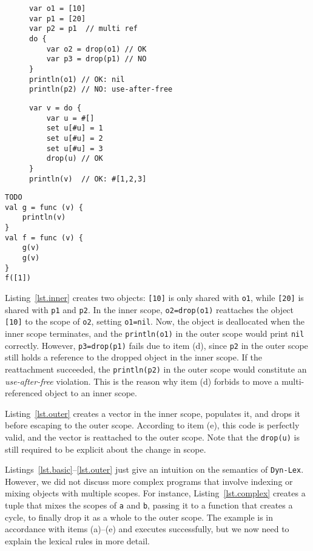 \documentclass[12pt]{article}
\newcommand{\code}[1] {\texttt{\footnotesize{#1}}}
\newcommand{\lex} {\texttt{Dyn-Lex}\xspace}
\begin{document}
\begin{figure}
\begin{minipage}[t]{0.5\textwidth}
\begin{lstlisting}[caption=Move to inner scope., label=lst.inner]
var o1 = [10]
var p1 = [20]
var p2 = p1  // multi ref
do {
    var o2 = drop(o1) // OK
    var p3 = drop(p1) // NO
}
println(o1) // OK: nil
println(p2) // NO: use-after-free
\end{lstlisting}
\end{minipage}
\begin{minipage}[t]{0.5\textwidth}
\begin{lstlisting}[caption=Move to outer scope., label=lst.outer]
var v = do {
    var u = #[]
    set u[#u] = 1
    set u[#u] = 2
    set u[#u] = 3
    drop(u) // OK
}
println(v)  // OK: #[1,2,3]

\end{lstlisting}
\end{minipage}
\end{figure}

\begin{verbatim}
TODO
val g = func (v) {
    println(v)
}
val f = func (v) {
    g(v)
    g(v)
}
f([1])
\end{verbatim}

Listing~\ref{lst.inner} creates two objects: \code{[10]} is only shared with
\code{o1}, while \code{[20]} is shared with \code{p1} and \code{p2}.
%
In the inner scope, \code{o2=drop(o1)} reattaches the object \code{[10]} to the
scope of \code{o2}, setting \code{o1=nil}.
Now, the object is deallocated when the inner scope terminates, and the
\code{println(o1)} in the outer scope would print \code{nil} correctly.
%
However, \code{p3=drop(p1)} fails due to item (d), since \code{p2} in the outer
scope still holds a reference to the dropped object in the inner scope.
If the reattachment succeeded, the \code{println(p2)} in the outer scope would
constitute an \emph{use-after-free} violation.
%
This is the reason why item (d) forbids to move a multi-referenced object to an
inner scope.

Listing~\ref{lst.outer} creates a vector in the inner scope, populates it, and
drops it before escaping to the outer scope.
According to item (e), this code is perfectly valid, and the vector is
reattached to the outer scope.
Note that the \code{drop(u)} is still required to be explicit about the change
in scope.

Listings~\ref{lst.basic}--\ref{lst.outer} just give an intuition on the
semantics of \lex.
However, we did not discuss more complex programs that involve indexing or
mixing objects with multiple scopes.
For instance, Listing~\ref{lst.complex} creates a tuple that mixes the scopes
of \code{a} and \code{b}, passing it to a function that creates a cycle, to
finally drop it as a whole to the outer scope.
The example is in accordance with items (a)--(e) and executes successfully, but
we now need to explain the lexical rules in more detail.
\end{document}
